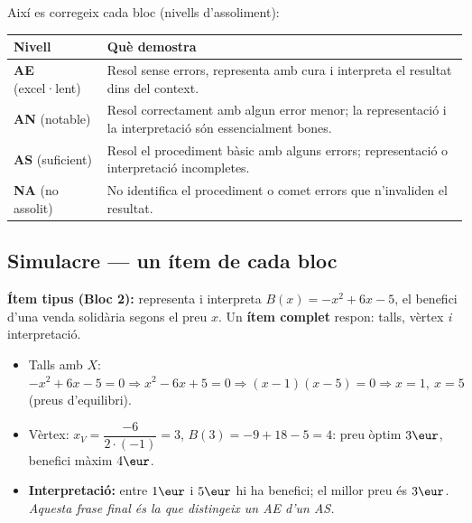 \noindent Així es corregeix cada bloc (nivells d'assoliment):
\begin{center}
\renewcommand{\arraystretch}{1.3}
\begin{tabular}{p{2.4cm} p{10.2cm}}
\toprule
\textbf{Nivell} & \textbf{Què demostra} \\
\midrule
\textbf{AE} (excel·lent) & Resol sense errors, representa amb cura i interpreta el
resultat dins del context. \\
\textbf{AN} (notable) & Resol correctament amb algun error menor; la representació i
la interpretació són essencialment bones. \\
\textbf{AS} (suficient) & Resol el procediment bàsic amb alguns errors; representació
o interpretació incompletes. \\
\textbf{NA} (no assolit) & No identifica el procediment o comet errors que
n'invaliden el resultat. \\
\bottomrule
\end{tabular}
\end{center}

\subsection{Simulacre — un ítem de cada bloc}

\begin{exemple}
\textbf{Ítem tipus (Bloc 2):} representa i interpreta $B(x)=-x^2+6x-5$, el benefici
d'una venda solidària segons el preu $x$. Un \textbf{ítem complet} respon: talls,
vèrtex \emph{i} interpretació.
\begin{itemize}[leftmargin=1.4em, itemsep=1pt]
  \item Talls amb $X$: $-x^2+6x-5=0 \Rightarrow x^2-6x+5=0 \Rightarrow (x-1)(x-5)=0
        \Rightarrow x=1,\ x=5$ (preus d'equilibri).
  \item Vèrtex: $x_V=\dfrac{-6}{2\cdot(-1)}=3$, $B(3)=-9+18-5=4$: preu òptim $3\eur$,
        benefici màxim $4\eur$.
  \item \textbf{Interpretació:} entre $1\eur$ i $5\eur$ hi ha benefici; el millor preu
        és $3\eur$. \emph{Aquesta frase final és la que distingeix un AE d'un AS.}
\end{itemize}
\end{exemple}

